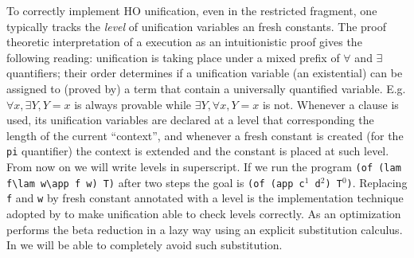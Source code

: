 \documentclass{llncs}
\begin{document}
To correctly implement HO unification, even in the restricted \Ll{} fragment,
one typically tracks the \emph{level} of unification variables an fresh constants.  The proof theoretic interpretation of a \lp{} execution as an intuitionistic proof gives the following reading: unification is taking place under
a mixed prefix of $\forall$ and $\exists$ quantifiers; their order
determines if a unification variable (an existential) can be assigned to
(proved by) a term that contain a universally quantified variable.
E.g. $\forall x,\exists Y, Y = x$ is always provable while
$\exists Y,\forall x, Y = x$ is not.
Whenever a clause is used, its unification variables are declared at
a level that corresponding the length of the current ``context'', and whenever
a fresh constant is created (for the \verb+pi+ quantifier) the context
is extended and the constant is placed at such level.  From now on we will
write levels in superscript.  If we run the program
\verb+(of (lam f\lam w\app f w) T)+ after two steps the goal is
\verb+(of (app c+$^1$\verb+ d+$^2$\verb+) T+$^0$\verb+)+.
Replacing \verb+f+ and \verb+w+ by fresh constant annotated with a level is the
implementation technique adopted by \tedius{} to make unification able to
check levels correctly.  As an optimization \tedius{} performs the beta
reduction in a lazy way using an explicit substitution calculus.  In \rff{} we
will be able to completely avoid such substitution.
\end{document}
